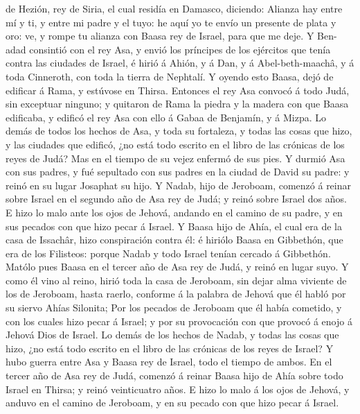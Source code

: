 de Hezión, rey de Siria, el cual residía en Damasco, diciendo:
 Alianza hay entre mí y ti, y entre mi padre y el tuyo:
he aquí yo te envío un presente de plata y oro: ve, y rompe tu alianza
con Baasa rey de Israel, para que me deje.  Y Ben-adad
consintió con el rey Asa, y envió los príncipes de los ejércitos que
tenía contra las ciudades de Israel, é hirió á Ahión, y á Dan, y á
Abel-beth-maachâ, y á toda Cinneroth, con toda la tierra de Nephtalí.
 Y oyendo esto Baasa, dejó de edificar á Rama, y estúvose
en Thirsa.  Entonces el rey Asa convocó á todo Judá, sin
exceptuar ninguno; y quitaron de Rama la piedra y la madera con que
Baasa edificaba, y edificó el rey Asa con ello á Gabaa de Benjamín, y á
Mizpa.  Lo demás de todos los hechos de Asa, y toda su
fortaleza, y todas las cosas que hizo, y las ciudades que edificó, ¿no
está todo escrito en el libro de las crónicas de los reyes de Judá? Mas
en el tiempo de su vejez enfermó de sus pies.  Y durmió
Asa con sus padres, y fué sepultado con sus padres en la ciudad de David
su padre: y reinó en su lugar Josaphat su hijo.  Y Nadab,
hijo de Jeroboam, comenzó á reinar sobre Israel en el segundo año de Asa
rey de Judá; y reinó sobre Israel dos años.  E hizo lo
malo ante los ojos de Jehová, andando en el camino de su padre, y en sus
pecados con que hizo pecar á Israel.  Y Baasa hijo de
Ahía, el cual era de la casa de Issachâr, hizo conspiración contra él: é
hiriólo Baasa en Gibbethón, que era de los Filisteos: porque Nadab y
todo Israel tenían cercado á Gibbethón.  Matólo pues
Baasa en el tercer año de Asa rey de Judá, y reinó en lugar suyo.
 Y como él vino al reino, hirió toda la casa de Jeroboam,
sin dejar alma viviente de los de Jeroboam, hasta raerlo, conforme á la
palabra de Jehová que él habló por su siervo Ahías Silonita;
 Por los pecados de Jeroboam que él había cometido, y con
los cuales hizo pecar á Israel; y por su provocación con que provocó á
enojo á Jehová Dios de Israel.  Lo demás de los hechos de
Nadab, y todas las cosas que hizo, ¿no está todo escrito en el libro de
las crónicas de los reyes de Israel?  Y hubo guerra entre
Asa y Baasa rey de Israel, todo el tiempo de ambos.  En
el tercer año de Asa rey de Judá, comenzó á reinar Baasa hijo de Ahía
sobre todo Israel en Thirsa; y reinó veinticuatro años. 
E hizo lo malo á los ojos de Jehová, y anduvo en el camino de Jeroboam,
y en su pecado con que hizo pecar á Israel.

